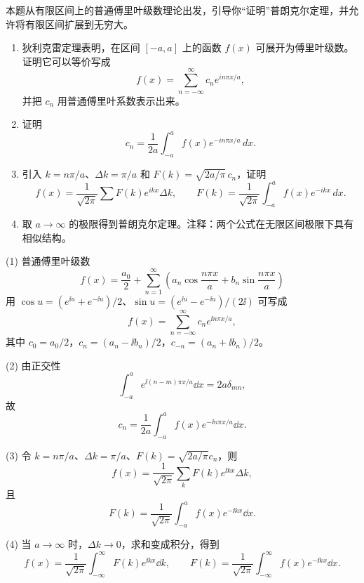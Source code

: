 \begin{question}
本题从有限区间上的普通傅里叶级数理论出发，引导你“证明”普朗克尔定理，并允许将有限区间扩展到无穷大。
\begin{enumerate}
\item 狄利克雷定理表明，在区间 $[-a,a]$ 上的函数 $f(x)$ 可展开为傅里叶级数。证明它可以等价写成
\[
f(x)=\sum_{n=-\infty}^{\infty}c_n e^{in\pi x/a},
\]
并把 $c_n$ 用普通傅里叶系数表示出来。
\item 证明
\[
c_n=\frac{1}{2a}\int_{-a}^{a}f(x)e^{-in\pi x/a}\,dx .
\]
\item 引入 $k=n\pi/a$、$\Delta k=\pi/a$ 和 $F(k)=\sqrt{2a/\pi}\,c_n$，证明
\[
f(x)=\frac{1}{\sqrt{2\pi}}\sum F(k)e^{ikx}\Delta k,
\qquad
F(k)=\frac{1}{\sqrt{2\pi}}\int_{-a}^{a}f(x)e^{-ikx}\,dx .
\]
\item 取 $a\to\infty$ 的极限得到普朗克尔定理。注释：两个公式在无限区间极限下具有相似结构。
\end{enumerate}
\end{question}
\begin{solution}
(1) 普通傅里叶级数
\[
f(x)=\frac{a_0}{2}+\sum_{n=1}^\infty\left(a_n\cos\frac{n\pi x}{a}+b_n\sin\frac{n\pi x}{a}\right)
\]
用 $\cos u=(e^{\ii u}+e^{-\ii u})/2$、$\sin u=(e^{\ii u}-e^{-\ii u})/(2\ii)$ 可写成
\[
f(x)=\sum_{n=-\infty}^{\infty}c_ne^{\ii n\pi x/a},
\]
其中 $c_0=a_0/2$，$c_n=(a_n-\ii b_n)/2$，$c_{-n}=(a_n+\ii b_n)/2$。

(2) 由正交性
\[
\int_{-a}^{a}e^{\ii(n-m)\pi x/a}\dd x=2a\delta_{mn},
\]
故
\[
c_n=\frac1{2a}\int_{-a}^{a}f(x)e^{-\ii n\pi x/a}\dd x.
\]

(3) 令 $k=n\pi/a$、$\Delta k=\pi/a$、$F(k)=\sqrt{2a/\pi}c_n$，则
\[
f(x)=\frac1{\sqrt{2\pi}}\sum_k F(k)e^{\ii kx}\Delta k,
\]
且
\[
F(k)=\frac1{\sqrt{2\pi}}\int_{-a}^{a}f(x)e^{-\ii kx}\dd x.
\]

(4) 当 $a\to\infty$ 时，$\Delta k\to0$，求和变成积分，得到
\[
f(x)=\frac1{\sqrt{2\pi}}\int_{-\infty}^{\infty}F(k)e^{\ii kx}\dd k,
\qquad
F(k)=\frac1{\sqrt{2\pi}}\int_{-\infty}^{\infty}f(x)e^{-\ii kx}\dd x.
\]
\end{solution}

